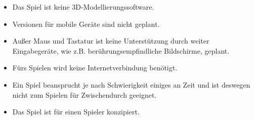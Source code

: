 \begin{itemize}



\item Das Spiel ist keine 3D-Modellierungssoftware.
\item Versionen für mobile Geräte sind nicht geplant.
\item Außer Maus und Tastatur ist keine Unterstützung durch weiter Eingabegeräte, wie z.B.  berührungsempfindliche Bildschirme, geplant.
\item Fürs Spielen wird keine Internetverbindung benötigt. 
\item Ein Spiel beansprucht je nach Schwierigkeit einiges an Zeit und ist deswegen nicht zum Spielen für Zwischendurch geeignet.
\item Das Spiel ist für einen Spieler konzipiert.

\end{itemize}